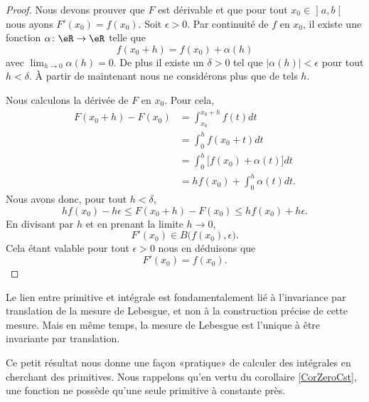 \begin{proof}
Nous devons prouver que \( F\) est dérivable et que pour tout \( x_0\in\mathopen] a , b \mathclose[\) nous ayons \( F'(x_0)=f(x_0)\). Soit \( \epsilon>0\). Par continuité de \( f\) en \( x_0\), il existe une fonction \( \alpha\colon \eR\to \eR\) telle que
    \begin{equation}
        f(x_0+h)=f(x_0)+\alpha(h)
    \end{equation}
    avec \( \lim_{h\to 0} \alpha(h)=0\). De plus il existe un \( \delta>0\) tel que \( |\alpha(h)|<\epsilon\) pour tout \( h<\delta\). À partir de maintenant nous ne considérons plus que de tels \( h\).

    Nous calculons la dérivée de \( F\) en \( x_0\). Pour cela,
    \begin{subequations}
        \begin{align}
            F(x_0+h)-F(x_0)&=\int_{x_0}^{x_0+h}f(t)dt\\
        &=\int_0^hf(x_0+t)dt\\
        &=\int_0^h\big[ f(x_0)+\alpha(t) \big]dt\\
        &=hf(x_0)+\int_0^{h}\alpha(t)dt.
        \end{align}
    \end{subequations}
    Nous avons donc, pour tout \( h<\delta\),
    \begin{equation}
        hf(x_0)-h\epsilon\leq F(x_0+h)-F(x_0)\leq hf(x_0)+h\epsilon.
    \end{equation}
    En divisant par \( h\) et en prenant la limite \( h\to 0\),
    \begin{equation}
        F'(x_0)\in B\big( f(x_0),\epsilon \big).
    \end{equation}
    Cela étant valable pour tout \( \epsilon>0\) nous en déduisons que
    \begin{equation}
        F'(x_0)=f(x_0).
    \end{equation}
\end{proof}

\begin{remark}
    Le lien entre primitive et intégrale est fondamentalement lié à l'invariance par translation de la mesure de Lebesgue, et non à la construction précise de cette mesure. Mais en même temps, la mesure de Lebesgue est l'unique à être invariante par translation.
\end{remark}

Ce petit résultat nous donne une façon «pratique» de calculer des intégrales en cherchant des primitives. Nous rappelons qu'en vertu du corollaire \ref{CorZeroCst}, une fonction ne possède qu'une seule primitive à constante près.

